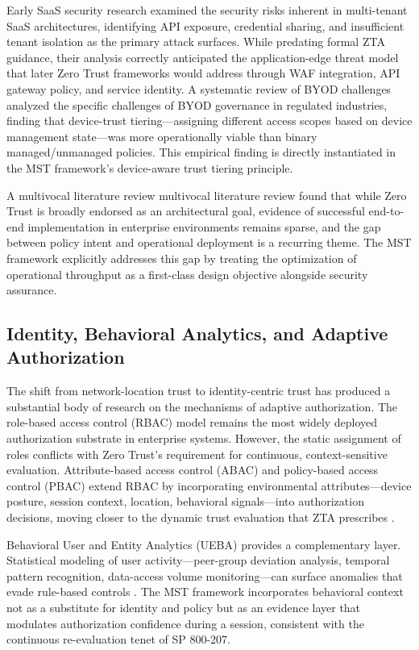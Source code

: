 \documentclass[unnumsec,webpdf,contemporary,large]{oup-authoring-template}
\theoremstyle{thmstyleone}
\theoremstyle{thmstyletwo}
\theoremstyle{thmstylethree}
\begin{document}
Early SaaS security research \cite{dechaves2011} examined the security risks inherent in multi-tenant
SaaS architectures, identifying API exposure, credential sharing, and insufficient
tenant isolation as the primary attack surfaces. While predating formal ZTA guidance, their
analysis correctly anticipated the application-edge threat model that later Zero Trust
frameworks would address through WAF integration, API gateway policy, and service identity.
A systematic review of BYOD challenges \cite{balasubramanian2021} analyzed the specific challenges of BYOD
governance in regulated industries, finding that device-trust tiering---assigning different
access scopes based on device management state---was more operationally viable than binary
managed/unmanaged policies. This empirical finding is directly instantiated in the MST
framework's device-aware trust tiering principle.

A multivocal literature review \cite{buck2021} multivocal literature review found that while Zero Trust is
broadly endorsed as an architectural goal, evidence of successful end-to-end implementation
in enterprise environments remains sparse, and the gap between policy intent and
operational deployment is a recurring theme. The MST framework explicitly addresses this
gap by treating the optimization of operational throughput as a first-class design objective
alongside security assurance.

\subsection{Identity, Behavioral Analytics, and Adaptive Authorization}

The shift from network-location trust to identity-centric trust has produced a substantial
body of research on the mechanisms of adaptive authorization. The role-based access control (RBAC) model \cite{sandhu1994} remains the most widely deployed
authorization substrate in enterprise systems. However, the static assignment of roles
conflicts with Zero Trust's requirement for continuous, context-sensitive evaluation.
Attribute-based access control (ABAC) and policy-based access control (PBAC) extend RBAC
by incorporating environmental attributes---device posture, session context, location,
behavioral signals---into authorization decisions, moving closer to the dynamic trust
evaluation that ZTA prescribes \cite{hu2014}.

Behavioral User and Entity Analytics (UEBA) provides a complementary layer. Statistical
modeling of user activity---peer-group deviation analysis, temporal pattern recognition,
data-access volume monitoring---can surface anomalies that evade rule-based controls
\cite{tuor2017}. The MST framework incorporates behavioral context not as a substitute
for identity and policy but as an evidence layer that modulates authorization confidence
during a session, consistent with the continuous re-evaluation tenet of SP 800-207.
\end{document}
